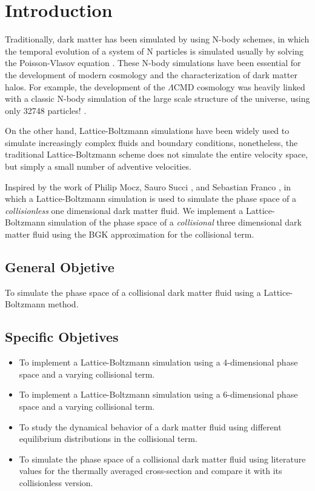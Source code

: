 \setcounter{page}{1}%
\newpage
\belowdisplayshortskip=0pt
\renewcommand{\thepage}{\arabic{page}}%
\chapter{Introduction}

Traditionally, dark matter has been simulated by using N-body schemes, in which the temporal evolution of a system of N particles is simulated usually by solving the Poisson-Vlasov equation \cite{2012PDU150K}.
These N-body simulations have been essential for the development of modern cosmology and the characterization of dark matter halos.
For example, the development of the $\Lambda$CMD cosmology was heavily linked with a classic N-body simulation of the large scale structure of the universe, using only 32748 particles! \cite{1985ApJ292371D}.

On the other hand, Lattice-Boltzmann simulations have been widely used to simulate increasingly complex fluids and boundary conditions, nonetheless, the traditional Lattice-Boltzmann scheme does not simulate the entire velocity space, but simply a small number of adventive velocities. 

Inspired by the work of Philip Mocz, Sauro Succi \cite{integerLatticeDynamics}, and Sebastian Franco \cite{franco}, in which a Lattice-Boltzmann simulation is used to simulate the phase space of a \emph{collisionless} one dimensional dark matter fluid. We implement a Lattice-Boltzmann simulation of the phase space of a \emph{collisional} three dimensional dark matter fluid using the BGK approximation for the collisional term.

\section{General Objetive}
To simulate the phase space of a collisional dark matter fluid using a Lattice-Boltzmann method.
\section{Specific Objetives}
\begin{itemize}
\item To implement a Lattice-Boltzmann simulation using a 4-dimensional phase space and a varying collisional term.
\item To implement a Lattice-Boltzmann simulation using a 6-dimensional phase space and a varying collisional term.
\item To study the dynamical behavior of a dark matter fluid using different equilibrium distributions in the collisional term.
\item To simulate the phase space of a collisional dark matter fluid using literature values for the thermally averaged cross-section and compare it with its collisionless version.
\end{itemize}


